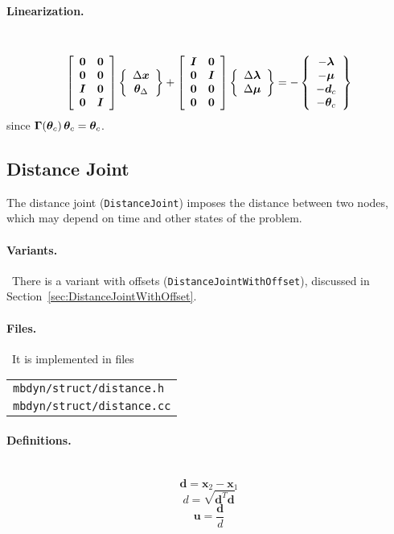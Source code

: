 \documentclass[10pt,fleqn,subeqn]{report}
\newcommand{\T}[1]{\bm{#1}}
\newcommand{\TT}[1]{\bm{#1}}
\begin{document}
\paragraph{Linearization.} \
\begin{equation}
	\sqbr{\matr{cc}{
	\TT{0} & \TT{0} \\
	\TT{0} & \TT{0} \\
	\TT{I} & \TT{0} \\
	\TT{0} & \TT{I}
	}} \cubr{\cvvect{
		\Delta\T{x} \\
		\T{\theta}_{\Delta}
	}}
	+ \sqbr{\matr{cc}{
		\TT{I} & \TT{0} \\
		\TT{0} & \TT{I} \\
		\TT{0} & \TT{0} \\
		\TT{0} & \TT{0}
	}} \cubr{\cvvect{
		\Delta\T{\lambda} \\
		\Delta\T{\mu}
	}}
	= - \cubr{\cvvect{
		- \T{\lambda} \\
		- \T{\mu} \\
		- \T{d}_c \\
		- \T{\theta}_c
	}}
\end{equation}
since $\TT{\Gamma}\!\plbr{\T{\theta}_c} \T{\theta}_c = \T{\theta}_c$.




\subsection{Distance Joint}
\label{sec:DistanceJoint}
The distance joint (\texttt{DistanceJoint}) imposes the distance between two nodes,
which may depend on time and other states of the problem.

\paragraph{Variants.} \
There is a variant with offsets (\texttt{DistanceJointWithOffset}),
discussed in Section~\ref{sec:DistanceJointWithOffset}.

\paragraph{Files.} \
It is implemented in files

\begin{tabular}{l}
\texttt{mbdyn/struct/distance.h} \\
\texttt{mbdyn/struct/distance.cc}
\end{tabular}

\paragraph{Definitions.} \
\begin{equation}
	\T{d} = \T{x}_2 - \T{x}_1
\end{equation}
\begin{equation}
	d = \sqrt{\T{d}^T \T{d}}
\end{equation}
\begin{equation}
	\T{u} = \frac{\T{d}}{d}
\end{equation}
\end{document}
